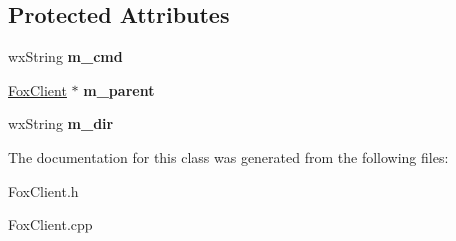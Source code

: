 \subsection*{Protected Attributes}
\begin{DoxyCompactItemize}
\item 
\mbox{\label{class_my_process_a12492384729a233649aadf1065380fe8}} 
wx\+String {\bfseries m\+\_\+cmd}
\item 
\mbox{\label{class_my_process_a7aa87faa4a57a0ac2494411cf02fc857}} 
\mbox{\hyperlink{class_fox_client}{Fox\+Client}} $\ast$ {\bfseries m\+\_\+parent}
\item 
\mbox{\label{class_my_process_a47811c6dd627bad3419f73413eb35db3}} 
wx\+String {\bfseries m\+\_\+dir}
\end{DoxyCompactItemize}


The documentation for this class was generated from the following files\+:\begin{DoxyCompactItemize}
\item 
Fox\+Client.\+h\item 
Fox\+Client.\+cpp\end{DoxyCompactItemize}
